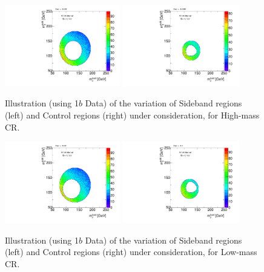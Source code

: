 \begin{figure}[htbp!]
\begin{center}
\includegraphics[angle=270, width=0.45\textwidth]{./figures/boosted/Syst_CRSB/CR_High_Sideband_OneTag_mH0H1.pdf}
\includegraphics[angle=270, width=0.45\textwidth]{./figures/boosted/Syst_CRSB/CR_High_Control_OneTag_mH0H1.pdf}\\
\end{center}
\caption{Illustration (using 1$b$ Data) of the variation of Sideband regions (left) and Control regions (right) under consideration, for High-mass CR.}
\label{CRSB:CR_High}
\end{figure}

\begin{figure}[htbp!]
\begin{center}
\includegraphics[angle=270, width=0.45\textwidth]{./figures/boosted/Syst_CRSB/CR_Low_Sideband_OneTag_mH0H1.pdf}
\includegraphics[angle=270, width=0.45\textwidth]{./figures/boosted/Syst_CRSB/CR_Low_Control_OneTag_mH0H1.pdf}\\
\end{center}
\caption{Illustration (using 1$b$ Data) of the variation of Sideband regions (left) and Control regions (right) under consideration, for Low-mass CR.}
\label{CRSB:CR_Low}
\end{figure}

